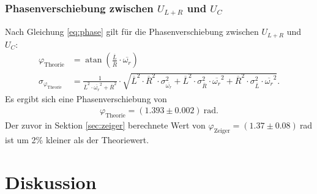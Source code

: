\documentclass[12pt,a4paper,titlepage,headinclude]{scrartcl}
\numberwithin{equation}{subsection}
\newcommand{\mrm}[1]{\mathrm{#1}}
\begin{document}
\subsubsection{Phasenverschiebung zwischen $U_{L+R}$ und $U_C$}
Nach Gleichung \eqref{eq:phase} gilt für die Phasenverschiebung zwischen $U_{L+R}$ und $U_C$:
\begin{align}
	\varphi_{\text{Theorie}}&=\operatorname{atan}{\left (\frac{\overline{L}}{\overline{R}} \cdot \overline{\omega_r} \right )}\\
	\sigma_{\varphi_{\text{Theorie}}}&=\frac{1}{\overline{L}^{2} \cdot \overline{\omega_r}^{2} + \overline{R}^{2}} \cdot \sqrt{\overline{L}^{2} \cdot \overline{R}^{2} \cdot \sigma_{\overline{\omega_r}}^{2} + \overline{L}^{2} \cdot \sigma_{\overline{R}}^{2} \cdot \overline{\omega_r}^{2} + \overline{R}^{2} \cdot \sigma_{\overline{L}}^{2} \cdot \overline{\omega_r}^{2}}.
	\label{eq:phasetheo}
\end{align}
Es ergibt sich eine Phasenverschiebung von 
\begin{align}
	\varphi_{\text{Theorie}}=(1.393 \pm 0.002)~\text{rad}.
	\label{eq:resphasetheo}
\end{align}
Der zuvor in Sektion \ref{sec:zeiger} berechnete Wert von $\varphi_{\mrm{Zeiger}}=(1.37\pm0.08)~$rad ist um 2\% kleiner als der Theoriewert. 

\section{Diskussion}
\label{sec:diskussion}
\end{document}
